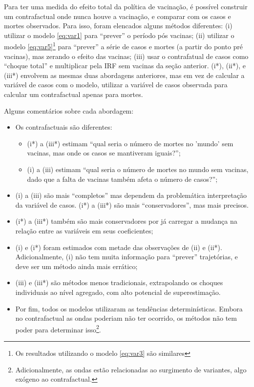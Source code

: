 \documentclass[
    article,
	12pt,				%
	oneside,			%
	a4paper,			%
	english,			%
	brazil,				%
	hyperref = {colorlinks, citecolor=c1d, linkcolor=c2d, urlcolor=c3d, colorlinks}
	]{abntex2}
\newcounter{j}
\begin{document}
Para ter uma medida do efeito total da política de vacinação, é possível construir um contrafactual onde nunca houve a vacinação, e comparar com os casos e mortes observados. Para isso, foram elencados alguns métodos diferentes: (i) utilizar o modelo \eqref{eq:var1} para ``prever'' o período pós vacinas; (ii) utilizar o modelo \eqref{eq:var5}\footnote{Os resultados utilizando o modelo \eqref{eq:var3} são similares} para ``prever'' a série de casos e mortes (a partir do ponto pré vacinas), mas zerando o efeito das vacinas; (iii) usar o contrafatual de casos como ``choque total'' e multiplicar pela IRF sem vacinas da seção anterior. (i*), (ii*), e (iii*) envolvem as mesmas duas abordagens anteriores, mas em vez de calcular a variável de casos com o modelo, utilizar a variável de casos observada para calcular um contrafactual apenas para mortes.

Alguns comentários sobre cada abordagem:

\begin{itemize}
    \item Os contrafactuais são diferentes:
    \begin{itemize}
    \item (i*) a (iii*) estimam ``qual seria o número de mortes no 'mundo' sem vacinas, mas onde os casos se mantiveram iguais?'';
    \item (i) a (iii) estimam ``qual seria o número de mortes no mundo sem vacinas, dado que a falta de vacinas também afeta o número de casos?'';
\end{itemize}
    \item (i) a (iii) são mais ``completos'' mas dependem da problemática interpretação da variável de casos. (i*) a (iii*) são mais ``conservadores'', mas mais precisos.
    \item (i*) a (iii*) também são mais conservadores por já carregar a mudança na relação entre as variáveis em seus coeficientes;
    \item (i) e (i*) foram estimados com metade das observações de (ii) e (ii*). Adicionalmente, (i) não tem muita informação para ``prever'' trajetórias, e deve ser um método ainda mais errático;
    \item (iii) e (iii*) são métodos menos tradicionais, extrapolando os choques individuais ao nível agregado, com alto potencial de superestimação.
    \item Por fim, todos os modelos utilizaram as tendências determinísticas. Embora no contrafactual as ondas poderiam não ter ocorrido, os métodos não tem poder para determinar isso\footnote{Adicionalmente, as ondas estão relacionadas ao surgimento de variantes, algo exógeno ao contrafactual.}.
\end{itemize}
\end{document}

